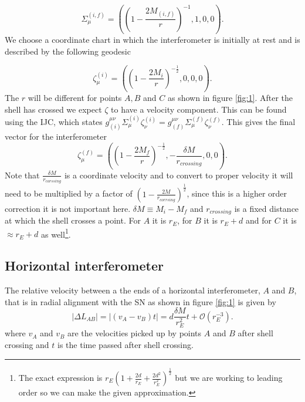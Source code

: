 \documentclass[aps,showpacs,twocolumn,floats,prd,superscriptaddress,nofootinbib]{revtex4-1}
\begin{document}
\begin{equation}
	\Sigma_\mu^{(i,f)} = \left( \left( 1 - \frac{2M_{(i,f)}}{r} \right)^{-1}, 1, 0, 0 \right).
\end{equation}
We choose a coordinate chart in which the interferometer is initially at rest and is described by the following geodesic

\begin{equation}
	\zeta_\mu^{(i)} = \left( \left( 1 - \frac{2M_i}{r} \right)^{-\frac{1}{2}}, 0, 0, 0 \right).
\end{equation}
The $r$ will be different for points $A,B$ and $C$ as shown in figure \ref{fig:1}. After the shell has crossed we expect $\zeta$ to have a velocity component. This can be found using the IJC, which states $g^{\mu \nu}_{(i)} \Sigma_\mu^{(i)} \zeta^{(i)}_\nu = g^{\mu \nu}_{(f)} \Sigma_\mu^{(f)} \zeta^{(f)}_\nu$. This gives the final vector for the interferometer
\begin{equation}
	\zeta_\mu^{(f)} = \left( \left( 1 - \frac{2M_f}{r} \right)^{-\frac{1}{2}}, - \frac{\delta M}{r_{crossing}}, 0, 0 \right).
\end{equation}
Note that $\frac{\delta M}{r_{corssing}}$ is a coordinate velocity and to convert to proper velocity it will need to be multiplied by a factor of $\left( 1 - \frac{2M}{r_{corrsing}} \right)^\frac{1}{2}$, since this is a higher order correction it is not important here. $\delta M \equiv M_i - M_f$ and $r_{crossing}$ is a fixed distance at which the shell crosses a point. For $A$ it is $r_E$, for $B$ it is $r_E + d$ and for $C$ it is $\approx r_E + d$ as well\footnote{The exact expression is $r_E \left( 1 + \frac{2d}{r_E} + \frac{2d^2}{r_E^2} \right)^\frac{1}{2}$ but we are working to leading order so we can make the given approximation.}. 

\subsection{Horizontal interferometer}

 The relative velocity between a the ends of a horizontal interferometer, $A$ and $B$, that is in radial alignment with the SN as shown in figure \ref{fig:1} is given by
\begin{equation}
	|\Delta L_{AB}| = | (v_A - v_B)t| = d \frac{\delta M}{r_E^2}  t+ \mathcal{O}(r_E^{-3}).
\end{equation}
where $v_A$ and $v_B$ are the velocities picked up by points $A$ and $B$ after shell crossing and $t$ is the time passed after shell crossing.
\end{document}
